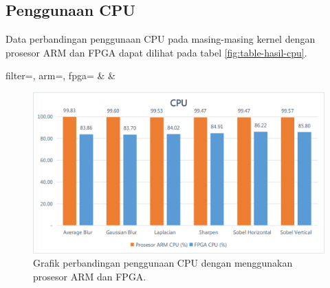 \subsection{Penggunaan CPU}
Data perbandingan penggunaan CPU pada masing-masing kernel dengan prosesor ARM dan FPGA dapat dilihat pada tabel \ref{fig:table-hasil-cpu}. 
\begin{atable}
    \caption{Tabel perbandingan penggunaan CPU dengan menggunakan prosesor ARM dan FPGA.}
    \label{table:hasil-cpu}
        {
            filter=\filter, 
            arm=\arm, 
            fpga=\fpga}
        {
            \filter & 
            \arm & 
            \fpga }
\end{atable}
\blindtext
\begin{figure}[H]
    \includegraphics[width=0.81\linewidth, center]{images/chart/chart-cpu.png}
    \caption{Grafik perbandingan penggunaan CPU dengan menggunakan prosesor ARM dan FPGA.}
    \label{fig:chart-cpu}
\end{figure}


